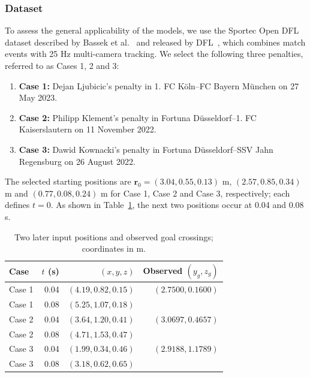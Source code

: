 \documentclass[12pt,letterpaper]{article}
\newcommand{\WMXPositionZero}{(3.04,0.55,0.13)}
\newcommand{\WRPositionZero}{(2.57,0.85,0.34)}
\newcommand{\WOHPositionZero}{(0.77,0.08,0.24)}
\newcommand{\PenaltyObservationTable}{\begin{table}[H]\centering\normalsize
\caption{Two later input positions and observed goal crossings; coordinates in m.}\label{tab:penalty-observations}
\setlength{\tabcolsep}{4pt}\begin{tabular}{lrrr}\toprule
Case & $t$ (s) & $(x,y,z)$ & Observed $(y_g,z_g)$\\\midrule
Case 1 & 0.04 & $(4.19,0.82,0.15)$ & $(2.7500,0.1600)$\\
Case 1 & 0.08 & $(5.25,1.07,0.18)$ & \\
Case 2 & 0.04 & $(3.64,1.20,0.41)$ & $(3.0697,0.4657)$\\
Case 2 & 0.08 & $(4.71,1.53,0.47)$ & \\
Case 3 & 0.04 & $(1.99,0.34,0.46)$ & $(2.9188,1.1789)$\\
Case 3 & 0.08 & $(3.18,0.62,0.65)$ & \\
\bottomrule\end{tabular}\end{table}}
\begin{document}
\subsubsection{Dataset}
To assess the general applicability of the models, we use the Sportec Open DFL dataset described by Bassek et al.\ \cite{bassek} and released by DFL~\cite{dataset}, which combines match events with 25 Hz multi-camera tracking. We select the following three penalties, referred to as Cases 1, 2 and 3:
\begin{enumerate}
\item \textbf{Case 1:} Dejan Ljubicic's penalty in 1. FC Köln--FC Bayern München on 27 May 2023.
\item \textbf{Case 2:} Philipp Klement's penalty in Fortuna Düsseldorf--1. FC Kaiserslautern on 11 November 2022.
\item \textbf{Case 3:} Dawid Kownacki's penalty in Fortuna Düsseldorf--SSV Jahn Regensburg on 26 August 2022.
\end{enumerate}

The selected starting positions are $\boldsymbol r_0=\WMXPositionZero$ m, $\WRPositionZero$ m and $\WOHPositionZero$ m for Case 1, Case 2 and Case 3, respectively; each defines $t=0$. As shown in Table~\ref{tab:penalty-observations}, the next two positions occur at 0.04 and 0.08 s.
\PenaltyObservationTable
\end{document}

